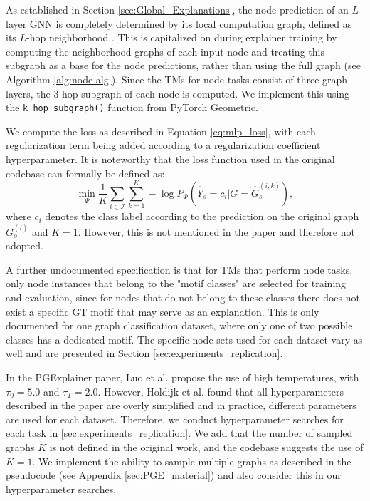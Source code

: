 As established in Section \ref{sec:Global_Explanations}, the node prediction of an $L$-layer GNN is completely determined by its local computation graph, defined as its $L$-hop neighborhood \cite{ying2019gnnexplainer}. This is capitalized on during explainer training by computing the neighborhood graphs of each input node and treating this subgraph as a base for the node predictions, rather than using the full graph (see Algorithm \ref{alg:node-alg}). Since the \acp{TM} for node tasks consist of three graph layers, the $3$-hop subgraph of each node is computed. We implement this using the \lstinline|k_hop_subgraph()| function from PyTorch Geometric. \bigskip

We compute the loss as described in Equation \ref{eq:mlp_loss}, with each regularization term being added according to a regularization coefficient hyperparameter. It is noteworthy that the loss function used in the original codebase can formally be defined as:
\begin{equation}
    \min_\Psi \frac{1}{K}\sum_{i\in \mathcal{I}}\sum_{k=1}^K -\log P_\Phi(\hat{Y}_s = c_i|G=\hat{G}_s^{(i,k)}),
\end{equation}
where $c_i$ denotes the class label according to the prediction on the original graph $G_o^{(i)}$ and $K=1$. However, this is not mentioned in the paper and therefore not adopted.  \bigskip

A further undocumented specification is that for \acp{TM} that perform node tasks, only node instances that belong to the "motif classes" are selected for training and evaluation, since for nodes that do not belong to these classes there does not exist a specific \ac{GT} motif that may serve as an explanation. This is only documented for one graph classification dataset, where only one of two possible classes has a dedicated motif. The specific node sets used for each dataset vary as well and are presented in Section \ref{sec:experiments_replication}.\bigskip

In the PGExplainer paper, Luo et al. \cite{luo2020parameterized} propose the use of high temperatures, with $\tau_0 = 5.0$ and $\tau_T=2.0$. However, Holdijk et al. \cite{holdijk2021re} found that all hyperparameters described in the paper are overly simplified and in practice, different parameters are used for each dataset. Therefore, we conduct hyperparameter searches for each task in \ref{sec:experiments_replication}. We add that the number of sampled graphs $K$ is not defined in the original work, and the codebase suggests the use of $K=1$. We implement the ability to sample multiple graphs as described in the pseudocode (see Appendix \ref{sec:PGE_material}) and also consider this in our hyperparameter searches. \bigskip

